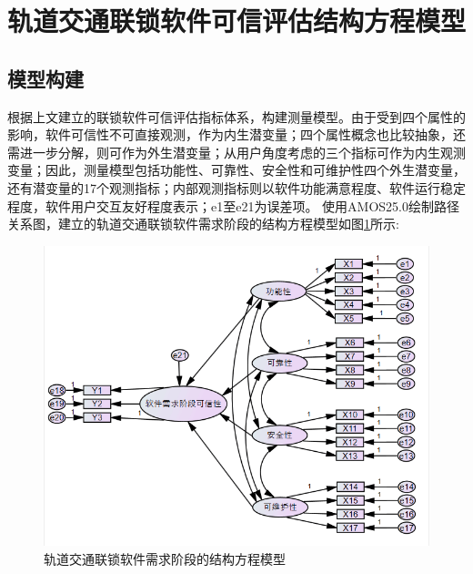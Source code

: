 \section{轨道交通联锁软件可信评估结构方程模型}
\subsection{模型构建}
根据上文建立的联锁软件可信评估指标体系，构建测量模型。由于受到四个属性的影响，软件可信性不可直接观测，作为内生潜变量；四个属性概念也比较抽象，还需进一步分解，则可作为外生潜变量；从用户角度考虑的三个指标可作为内生观测变量；因此，测量模型包括功能性、可靠性、安全性和可维护性四个外生潜变量，还有潜变量的17个观测指标；内部观测指标则以软件功能满意程度、软件运行稳定程度，软件用户交互友好程度表示；e1至e21为误差项。
使用AMOS25.0绘制路径关系图，建立的轨道交通联锁软件需求阶段的结构方程模型如图\ref{fig:3_01}所示:
\begin{figure}[htb]
	\centering
	\includegraphics[width=13cm]{fig/3_1.png}
	\caption{轨道交通联锁软件需求阶段的结构方程模型}
	\label{fig:3_01}
\end{figure}

